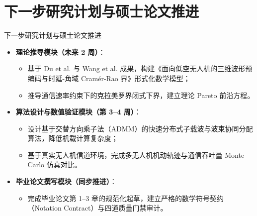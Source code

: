 \documentclass[aspectratio=169, 10pt]{ctexbeamer}
\begin{document}
\section{下一步研究计划与硕士论文推进}
\begin{frame}{下一步研究计划与硕士论文推进}
  \begin{itemize}
    \item \textbf{理论推导模块（未来 2 周）}：
    \begin{itemize}
      \item 基于 Du et al. 与 Wang et al. 成果，构建《面向低空无人机的三维波形预编码与时延-角域 Cramér-Rao 界》形式化数学模型；
      \item 推导通信速率约束下的克拉美罗界闭式下界，建立理论 Pareto 前沿方程。
    \end{itemize}
    \item \textbf{算法设计与数值验证模块（第 3--4 周）}：
    \begin{itemize}
      \item 设计基于交替方向乘子法（ADMM）的快速分布式子载波与波束协同分配算法，降低机载计算复杂度；
      \item 基于真实无人机信道环境，完成多无人机机动轨迹与通信吞吐量 Monte Carlo 仿真对比。
    \end{itemize}
    \item \textbf{毕业论文撰写模块（同步推进）}：
    \begin{itemize}
      \item 完成毕业论文第 1--3 章的规范化起草，建立严格的数学符号契约（Notation Contract）与四道质量门禁审计。
    \end{itemize}
  \end{itemize}
\end{frame}
\end{document}
